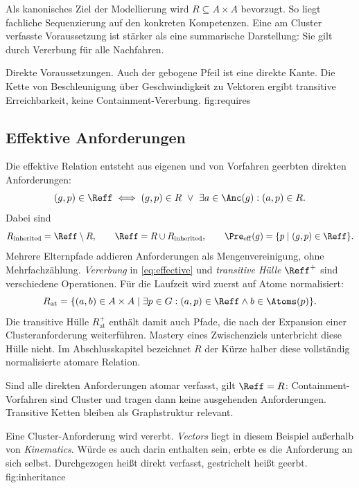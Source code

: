 Als kanonisches Ziel der Modellierung wird $R\subseteq A\times A$
bevorzugt. So liegt fachliche Sequenzierung auf den konkreten Kompetenzen.
Eine am Cluster verfasste Voraussetzung ist stärker als eine summarische
Darstellung: Sie gilt durch Vererbung für alle Nachfahren.

{Direkte Voraussetzungen. Auch der gebogene Pfeil ist eine direkte Kante.
Die Kette von Beschleunigung über Geschwindigkeit zu Vektoren ergibt
transitive Erreichbarkeit, keine Containment-Vererbung.}
{fig:requires}
\FloatBarrier

\subsection{Effektive Anforderungen}
Die effektive Relation entsteht aus eigenen und von Vorfahren geerbten
direkten Anforderungen:
\begin{equation}
 (g,p)\in\Reff\iff
 (g,p)\in R\ \lor\ \exists a\in\Anc(g):(a,p)\in R.
 \label{eq:effective}
\end{equation}
Dabei sind
\[
 R_{\mathrm{inherited}}=\Reff\setminus R,\qquad
 \Reff=R\cup R_{\mathrm{inherited}},\qquad
 \Pre_{\mathrm{eff}}(g)=\{p\mid(g,p)\in\Reff\}.
\]
Mehrere Elternpfade addieren Anforderungen als Mengenvereinigung, ohne
Mehrfachzählung. \emph{Vererbung} in \eqref{eq:effective} und
\emph{transitive Hülle} $\Reff^+$ sind verschiedene Operationen.
Für die Laufzeit wird zuerst auf Atome normalisiert:
\[
 R_{\mathrm{at}}=\{(a,b)\in A\times A\mid
       \exists p\in G:(a,p)\in\Reff\land b\in\Atoms(p)\}.
\]
Die transitive Hülle $R_{\mathrm{at}}^+$ enthält damit auch Pfade, die
nach der Expansion einer Clusteranforderung weiterführen. Mastery eines
Zwischenziels unterbricht diese Hülle nicht. Im Abschlusskapitel bezeichnet
$R$ der Kürze halber diese vollständig normalisierte atomare Relation.

Sind alle direkten Anforderungen atomar verfasst, gilt $\Reff=R$:
Containment-Vorfahren sind Cluster und tragen dann keine ausgehenden
Anforderungen. Transitive Ketten bleiben als Graphstruktur relevant.

{Eine Cluster-Anforderung wird vererbt. \emph{Vectors} liegt in diesem
Beispiel außerhalb von \emph{Kinematics}. Würde es auch darin enthalten sein,
erbte es die Anforderung an sich selbst. Durchgezogen heißt direkt verfasst,
gestrichelt heißt geerbt.}
{fig:inheritance}
\FloatBarrier

